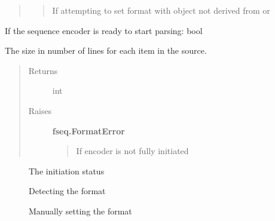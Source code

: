 \documentclass[letterpaper,10pt,english]{sphinxmanual}
\begin{document}
\begin{fulllineitems}
\begin{fulllineitems}
\begin{quote}
\begin{description}
\begin{quote}
If attempting to set format with object not derived from
 or 
\end{quote}

\end{description}\end{quote}

\end{fulllineitems}


\begin{fulllineitems}
\label{fseq.reading:fseq.reading.seq_encoder.SeqEncoder.initiated}
If the sequence encoder is ready to start parsing: bool

\end{fulllineitems}


\begin{fulllineitems}
\label{fseq.reading:fseq.reading.seq_encoder.SeqEncoder.itemSize}
The size in number of lines for each item in the source.
\begin{quote}\begin{description}
\item[{Returns}] \leavevmode
int

\item[{Raises}] \leavevmode
\textbf{fseq.FormatError}
\begin{quote}

If encoder is not fully initiated
\end{quote}

\end{description}\end{quote}



\begin{description}
\item[{{\hyperref[fseq.reading:fseq.reading.seq_encoder.SeqEncoder.initiated]{}}}] \leavevmode
The initiation status

\item[{{\hyperref[fseq.reading:fseq.reading.seq_encoder.SeqEncoder.detectFormat]{}}}] \leavevmode
Detecting the format

\item[{{\hyperref[fseq.reading:fseq.reading.seq_encoder.SeqEncoder.format]{}}}] \leavevmode
Manually setting the format


\end{description}
\end{fulllineitems}
\end{fulllineitems}
\end{document}
